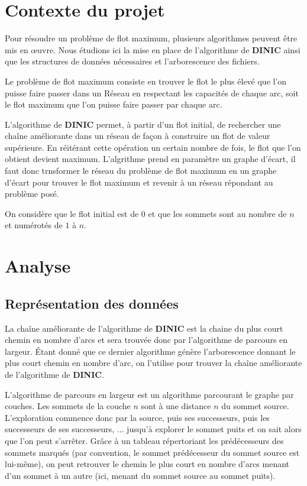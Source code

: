 \documentclass[11pt, a4paper]{report}
\begin{document}
	
	\tableofcontents
	
	
	\chapter{Contexte du projet}
	Pour résoudre un problème de flot maximum, plusieurs algorithmes peuvent être mis en œuvre. Nous étudions ici la mise en place de l'algorithme de \textbf{DINIC} ainsi que les structures de données nécessaires et l'arborescence des fichiers.
	
	Le problème de flot maximum consiste en trouver le flot le plus élevé que l'on puisse faire passer dans un Réseau en respectant les capacités de chaque arc, soit le flot maximum que l'on puisse faire passer par chaque arc.
	
	L'algorithme de \textbf{DINIC} permet, à partir d'un flot initial, de rechercher une chaîne améliorante dans un réseau de façon à construire un flot de valeur supérieure. En réitérant cette opération un certain nombre de fois, le flot que l'on obtient devient maximum. L'algrithme prend en paramètre un graphe d'écart, il faut donc trnsformer le réseau du problème de flot maximum en un graphe d'écart pour trouver le flot maximum et revenir à un réseau répondant au problème posé.
	
	On considère que le flot initial est de 0 et que les sommets sont au nombre de $n$ et numérotés de $1$ à $n$.
	
	
	
	\chapter{Analyse}
	\section{Représentation des données}
	La chaîne améliorante de l'algorithme de \textbf{DINIC} est la chaine du plus court chemin en nombre d'arcs et sera trouvée donc par l'algorithme de parcours en largeur. Étant donné que ce dernier algorithme génère l'arborescence donnant le plus court chemin en nombre d'arc, on l'utilise pour trouver la chaîne améliorante de l'algorithme de \textbf{DINIC}.
	
	L’algorithme de parcours en largeur est un algorithme parcourant le graphe par couches. Les sommets de la couche $n$ sont à une distance $n$ du sommet source. L’exploration commence donc par la source, puis ses successeurs, puis les successeurs de ses successeurs, ... jusqu’à explorer le sommet puits et on sait alors que l’on peut s’arrêter. Grâce à un tableau répertoriant les prédécesseurs des sommets marqués (par convention, le sommet prédécesseur du sommet source est lui-même), on peut retrouver le chemin le plus court en nombre d'arcs menant d’un sommet à un autre (ici, menant du sommet source au sommet puits).
	
\end{document}
